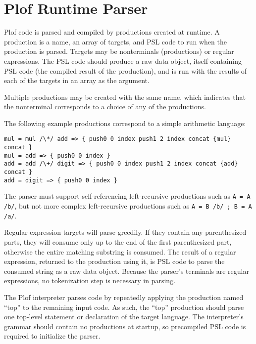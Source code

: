 \chapter{Plof Runtime Parser}

Plof code is parsed and compiled by productions created at runtime. A production is a name, an array of targets, and PSL code to run when the production is parsed. Targets may be nonterminals (productions) or regular expressions. The PSL code should produce a raw data object, itself containing PSL code (the compiled result of the production), and is run with the results of each of the targets in an array as the argument.

Multiple productions may be created with the same name, which indicates that the nonterminal corresponds to a choice of any of the productions.

The following example productions correspond to a simple arithmetic language:

\begin{verbatim}
mul = mul /\*/ add => { push0 0 index push1 2 index concat {mul} concat }
mul = add => { push0 0 index }
add = add /\+/ digit => { push0 0 index push1 2 index concat {add} concat }
add = digit => { push0 0 index }
\end{verbatim}

The parser must support self-referencing left-recursive productions such as \texttt{A = A /b/}, but not more complex left-recursive productions such as \texttt{A = B /b/ ; B = A /a/}.

Regular expression targets will parse greedily. If they contain any parenthesized parts, they will consume only up to the end of the first parenthesized part, otherwise the entire matching substring is consumed. The result of a regular expression, returned to the production using it, is PSL code to parse the consumed string as a raw data object. Because the parser's terminals are regular expressions, no tokenization step is necessary in parsing.

The Plof interpreter parses code by repeatedly applying the production named ``top'' to the remaining input code. As such, the ``top'' production should parse one top-level statement or declaration of the target language. The interpreter's grammar should contain no productions at startup, so precompiled PSL code is required to initialize the parser.
